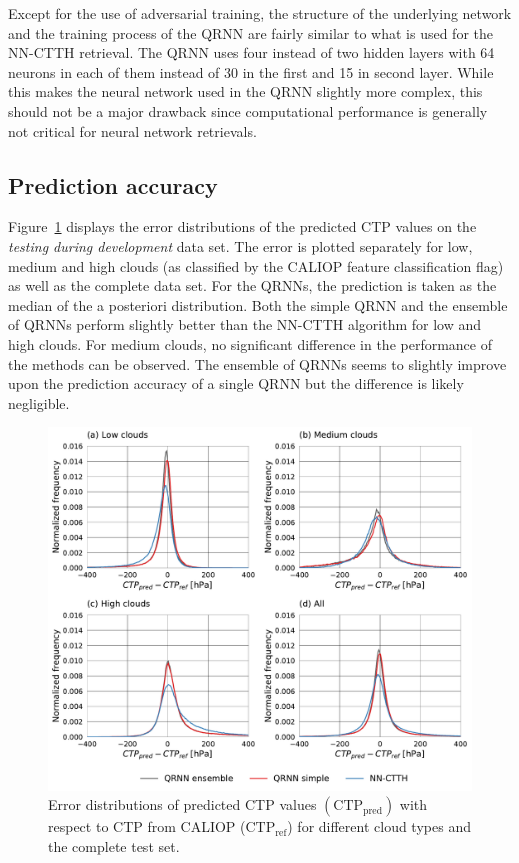 \documentclass[journal abbreviation, manuscript]{copernicus}
\begin{document}
Except for the use of adversarial training, the structure of the underlying
network and the training process of the QRNN are fairly similar to what is used
for the NN-CTTH retrieval. The QRNN uses four instead of two hidden layers with
64 neurons in each of them instead of 30 in the first and 15 in second layer.
While this makes the neural network used in the QRNN slightly more complex, this
should not be a major drawback since computational performance is generally not
critical for neural network retrievals.

\subsection{Prediction accuracy}


Figure~\ref{fig:ctp_results} displays the error distributions of the predicted
CTP values on the \textit{testing during development} data set. The error is
plotted separately for low, medium and high clouds (as classified by the CALIOP
feature classification flag) as well as the complete data set. For the QRNNs, the
prediction is taken as the median of the a posteriori distribution. Both the simple
QRNN and the ensemble of QRNNs perform slightly better than the NN-CTTH
algorithm for low and high clouds. For medium clouds, no significant difference
in the performance of the methods can be observed. The ensemble of QRNNs seems
to slightly improve upon the prediction accuracy of a single QRNN but the
difference is likely negligible.

\begin{figure}[hbpt!]
  \centering
  \includegraphics[width = 1.0\linewidth]{../plots/fig08}
  \caption{Error distributions of predicted CTP values $(\text{CTP}_{\text{pred}})$ with
    respect to CTP from CALIOP ($\text{CTP}_{\text{ref}}$) for different cloud types and the complete test set.}
  \label{fig:ctp_results}
\end{figure}
\end{document}
